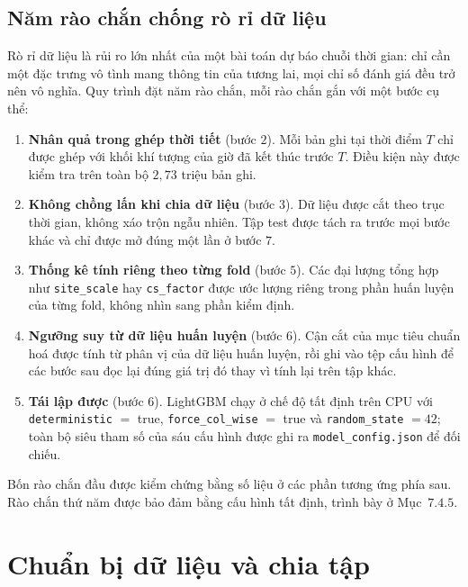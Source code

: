 \FloatBarrier
\subsection{Năm rào chắn chống rò rỉ dữ liệu}

Rò rỉ dữ liệu là rủi ro lớn nhất của một bài toán dự báo chuỗi thời gian: chỉ cần một
đặc trưng vô tình mang thông tin của tương lai, mọi chỉ số đánh giá đều trở nên vô
nghĩa. Quy trình đặt năm rào chắn, mỗi rào chắn gắn với một bước cụ thể:

\begin{enumerate}
    \item \textbf{Nhân quả trong ghép thời tiết} (bước $2$). Mỗi bản ghi tại thời điểm
    $T$ chỉ được ghép với khối khí tượng của giờ đã kết thúc trước $T$. Điều kiện này
    được kiểm tra trên toàn bộ $2{,}73$ triệu bản ghi.

    \item \textbf{Không chồng lấn khi chia dữ liệu} (bước $3$). Dữ liệu được cắt theo
    trục thời gian, không xáo trộn ngẫu nhiên. Tập test được tách ra trước mọi bước
    khác và chỉ được mở đúng một lần ở bước $7$.

    \item \textbf{Thống kê tính riêng theo từng fold} (bước $5$). Các đại lượng tổng
    hợp như \texttt{site\_scale} hay \texttt{cs\_factor} được ước lượng riêng trong
    phần huấn luyện của từng fold, không nhìn sang phần kiểm định.

    \item \textbf{Ngưỡng suy từ dữ liệu huấn luyện} (bước $6$). Cận cắt của mục tiêu
    chuẩn hoá được tính từ phân vị của dữ liệu huấn luyện, rồi ghi vào tệp cấu hình để
    các bước sau đọc lại đúng giá trị đó thay vì tính lại trên tập khác.

    \item \textbf{Tái lập được} (bước $6$). LightGBM chạy ở chế độ tất định trên CPU với
    \texttt{deterministic} $=$ true, \texttt{force\_col\_wise} $=$ true và
    \texttt{random\_state} $=42$; toàn bộ siêu tham số của sáu cấu hình được ghi ra
    \texttt{model\_config.json} để đối chiếu.
\end{enumerate}

Bốn rào chắn đầu được kiểm chứng bằng số liệu ở các phần tương ứng phía sau. Rào chắn
thứ năm được bảo đảm bằng cấu hình tất định, trình bày ở Mục~$7.4.5$.

\FloatBarrier
\section{Chuẩn bị dữ liệu và chia tập}

